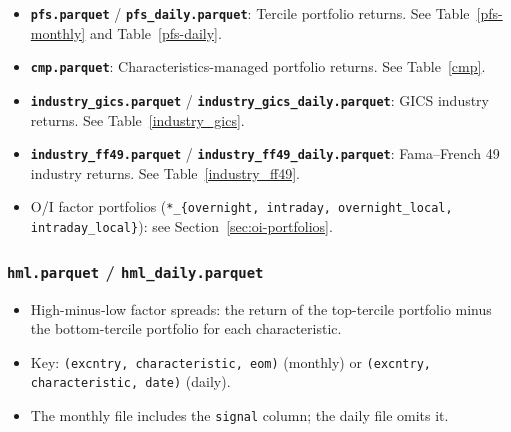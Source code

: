 \documentclass[12pt,title,fleqn]{article}
\begin{document}
\begin{itemize}
  \item \textbf{\texttt{pfs.parquet}} / \textbf{\texttt{pfs\_daily.parquet}}: Tercile portfolio returns.  See Table~\ref{pfs-monthly} and Table~\ref{pfs-daily}.
  \item \textbf{\texttt{cmp.parquet}}: Characteristics-managed portfolio returns.  See Table~\ref{cmp}.
  \item \textbf{\texttt{industry\_gics.parquet}} / \textbf{\texttt{industry\_gics\_daily.parquet}}: GICS industry returns.  See Table~\ref{industry_gics}.
  \item \textbf{\texttt{industry\_ff49.parquet}} / \textbf{\texttt{industry\_ff49\_daily.parquet}}: Fama--French 49 industry returns.  See Table~\ref{industry_ff49}.
  \item O/I factor portfolios (\texttt{*\_\{overnight, intraday, overnight\_local, intraday\_local\}}): see Section~\ref{sec:oi-portfolios}.
\end{itemize}

\subsubsection{\texttt{hml.parquet} / \texttt{hml\_daily.parquet}}\label{sec:hml}
\begin{itemize}
  \item High-minus-low factor spreads: the return of the top-tercile portfolio minus the bottom-tercile portfolio for each characteristic.
  \item Key: \texttt{(excntry, characteristic, eom)} (monthly) or \texttt{(excntry, characteristic, date)} (daily).
  \item The monthly file includes the \texttt{signal} column; the daily file omits it.
\end{itemize}
\end{document}
